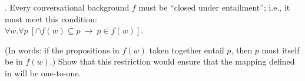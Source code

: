 \begin{exercise}
\begin{itemize}
		\ex. Every conversational background $f$ must be ``closed under entailment''; i.e., it must meet this condition:\\
		$\forall w. \forall p\ [ \ensuremath{\cap}f(w) \ensuremath{\subseteq} p\ \rightarrow\ p \in f(w) ]$.
		
		(In words: if the propositions in $f(w)$ taken together entail
    $p$, then $p$ must itself be in $f(w)$.) Show that this
    restriction would ensure that the mapping defined in \LLast will
    be one-to-one. \eex
	\end{itemize}
\end{exercise}


